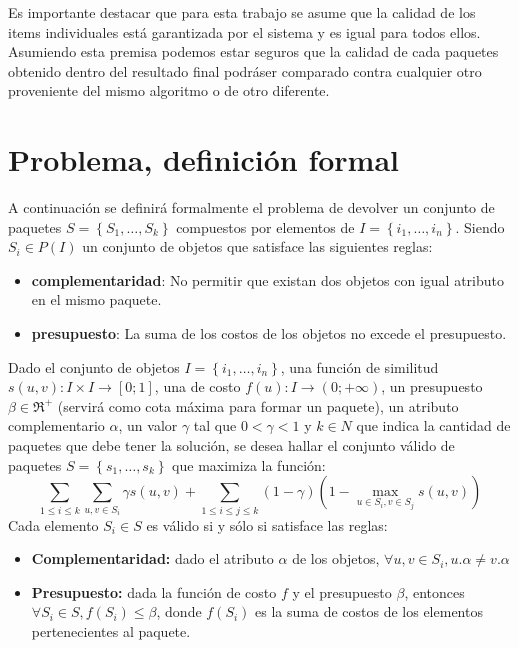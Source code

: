Es importante destacar que para esta trabajo se asume que la calidad de los items individuales está garantizada por el sistema y es igual para todos ellos. Asumiendo esta premisa podemos estar seguros que la calidad de cada paquetes obtenido dentro del resultado final podráser comparado contra cualquier otro proveniente del mismo algoritmo o de otro diferente.

\section{Problema, definición formal}
A continuación se definirá formalmente el problema de devolver un conjunto de paquetes $S = \left\{S_1, \ldots, S_k\right\}$ compuestos por elementos de $I=\left\{i_1,\ldots, i_n\right\}$. Siendo $S_i \in P(I)$ un conjunto de objetos que satisface las siguientes reglas:
\begin{itemize}
\item \textbf{complementaridad}:  No permitir que existan dos objetos con igual atributo en el mismo paquete.
	\item \textbf{presupuesto}: La suma de los costos de los objetos no excede el presupuesto.
\end{itemize}

Dado el conjunto de objetos $I=\left\{i_1,\ldots, i_n\right\}$, una función de similitud $s(u,v): I \times I \rightarrow [0;1]$, una de costo $f(u): I \rightarrow (0;+\infty)$, un presupuesto $\beta \in \Re^{+}$ (servirá como cota máxima para formar un paquete), un atributo complementario $\alpha$, un valor $\gamma$ tal que $0 < \gamma < 1$ y $k \in N$ que indica la cantidad de paquetes que debe tener la solución, se desea hallar el conjunto válido de paquetes $S = \left\{s_1, \ldots, s_k\right\}$ que maximiza la función:
\begin{equation} \label{des:eq-fnObj}
\sum_{1 \leq i \leq k}{\sum_{u,v \in S_i}{\gamma s(u,v)}} + \sum_{1 \leq i \leq j \leq k}{(1-\gamma) (1-\max_{u \in S_i, v \in S_j}{s(u,v)})}
\end{equation}
Cada elemento $S_i \in S$ es válido si y sólo si satisface las reglas:
\begin{itemize}
	\item \textbf{Complementaridad:} dado el atributo $\alpha$ de los objetos, $\forall u,v \in S_i, u.\alpha \neq v.\alpha$
	\item \textbf{Presupuesto:} dada la función de costo $f$ y el presupuesto $\beta$, entonces $\forall S_i \in S, f(S_i) \leq \beta$, donde $f(S_i)$ es la suma de costos de los elementos pertenecientes al paquete.
\end{itemize}		  

